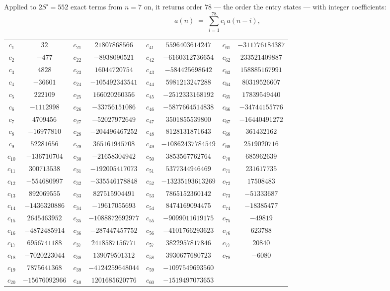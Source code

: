 \documentclass[11pt,a4paper]{article}
\theoremstyle{plain}
\theoremstyle{definition}
\begin{document}
Applied to $2S'=552$ exact terms from $n=7$ on, it returns order $78$ --- the
order the entry states --- with integer coefficients:
\[
a(n)\;=\;\sum_{i=1}^{78}c_i\,a(n-i),
\]
\begin{center}\small
\begin{tabular}{cccccccc}
$c_{1}$ & $32$ & $c_{21}$ & $21807868566$ & $c_{41}$ & $5596403614247$ & $c_{61}$ & $-311776184387$ \\
$c_{2}$ & $-477$ & $c_{22}$ & $-8938090521$ & $c_{42}$ & $-6160312736654$ & $c_{62}$ & $233521409887$ \\
$c_{3}$ & $4828$ & $c_{23}$ & $16044720754$ & $c_{43}$ & $-584425698642$ & $c_{63}$ & $158885167991$ \\
$c_{4}$ & $-36601$ & $c_{24}$ & $-105492343541$ & $c_{44}$ & $5981213247288$ & $c_{64}$ & $80319526607$ \\
$c_{5}$ & $222109$ & $c_{25}$ & $166020260356$ & $c_{45}$ & $-2512333168192$ & $c_{65}$ & $17839549440$ \\
$c_{6}$ & $-1112998$ & $c_{26}$ & $-33756151086$ & $c_{46}$ & $-5877664514838$ & $c_{66}$ & $-34744155776$ \\
$c_{7}$ & $4709456$ & $c_{27}$ & $-52027972649$ & $c_{47}$ & $3501855539800$ & $c_{67}$ & $-16440491272$ \\
$c_{8}$ & $-16977810$ & $c_{28}$ & $-204496467252$ & $c_{48}$ & $8128131871643$ & $c_{68}$ & $361432162$ \\
$c_{9}$ & $52281656$ & $c_{29}$ & $365161945708$ & $c_{49}$ & $-10862437784549$ & $c_{69}$ & $2519020716$ \\
$c_{10}$ & $-136710704$ & $c_{30}$ & $-21658304942$ & $c_{50}$ & $3853567762764$ & $c_{70}$ & $685962639$ \\
$c_{11}$ & $300713538$ & $c_{31}$ & $-192005417073$ & $c_{51}$ & $5377344946469$ & $c_{71}$ & $231617735$ \\
$c_{12}$ & $-554680997$ & $c_{32}$ & $-335546178848$ & $c_{52}$ & $-13235193613269$ & $c_{72}$ & $17508483$ \\
$c_{13}$ & $892069555$ & $c_{33}$ & $827515904491$ & $c_{53}$ & $7865152360142$ & $c_{73}$ & $-51333687$ \\
$c_{14}$ & $-1436320886$ & $c_{34}$ & $-19617055693$ & $c_{54}$ & $8474169094475$ & $c_{74}$ & $-18385477$ \\
$c_{15}$ & $2645463952$ & $c_{35}$ & $-1088872692977$ & $c_{55}$ & $-9099011619175$ & $c_{75}$ & $-49819$ \\
$c_{16}$ & $-4872485914$ & $c_{36}$ & $-287447457752$ & $c_{56}$ & $-4101766293623$ & $c_{76}$ & $623788$ \\
$c_{17}$ & $6956741188$ & $c_{37}$ & $2418587156771$ & $c_{57}$ & $3822957817846$ & $c_{77}$ & $20840$ \\
$c_{18}$ & $-7020223044$ & $c_{38}$ & $139079501312$ & $c_{58}$ & $3930677680723$ & $c_{78}$ & $-6080$ \\
$c_{19}$ & $7875641368$ & $c_{39}$ & $-4124259648044$ & $c_{59}$ & $-1097549693560$ &  &  \\
$c_{20}$ & $-15676092966$ & $c_{40}$ & $1201685620776$ & $c_{60}$ & $-1519497073653$ &  &  \\
\end{tabular}
\end{center}
\end{document}
